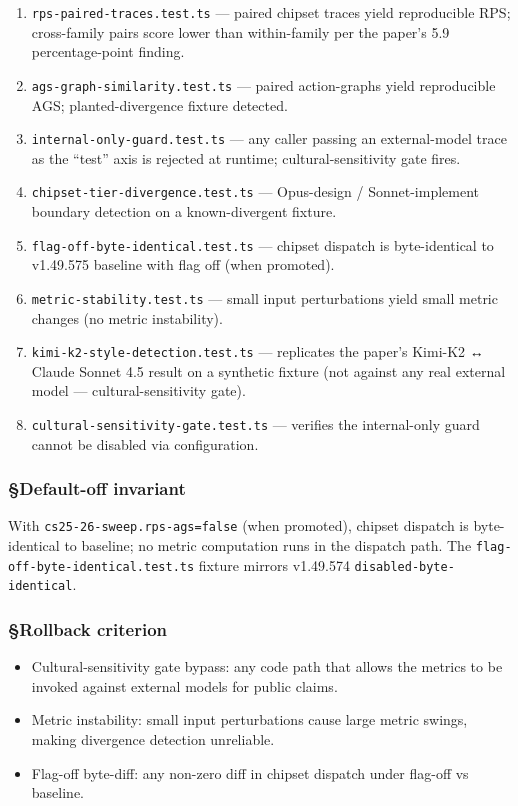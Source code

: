 \documentclass[11pt,letterpaper]{article}
\providecommand{\tightlist}{\setlength{\itemsep}{0pt}\setlength{\parskip}{0pt}}
\begin{document}
\begin{enumerate}
\def\labelenumi{\arabic{enumi}.}
\tightlist
\item
  \texttt{rps-paired-traces.test.ts} --- paired chipset traces yield
  reproducible RPS; cross-family pairs score lower than within-family
  per the paper's 5.9 percentage-point finding.
\item
  \texttt{ags-graph-similarity.test.ts} --- paired action-graphs yield
  reproducible AGS; planted-divergence fixture detected.
\item
  \texttt{internal-only-guard.test.ts} --- any caller passing an
  external-model trace as the ``test'' axis is rejected at runtime;
  cultural-sensitivity gate fires.
\item
  \texttt{chipset-tier-divergence.test.ts} --- Opus-design /
  Sonnet-implement boundary detection on a known-divergent fixture.
\item
  \texttt{flag-off-byte-identical.test.ts} --- chipset dispatch is
  byte-identical to v1.49.575 baseline with flag off (when promoted).
\item
  \texttt{metric-stability.test.ts} --- small input perturbations yield
  small metric changes (no metric instability).
\item
  \texttt{kimi-k2-style-detection.test.ts} --- replicates the paper's
  Kimi-K2 ↔ Claude Sonnet 4.5 result on a synthetic fixture (not against
  any real external model --- cultural-sensitivity gate).
\item
  \texttt{cultural-sensitivity-gate.test.ts} --- verifies the
  internal-only guard cannot be disabled via configuration.
\end{enumerate}

\subsubsection{§Default-off invariant}

With \texttt{cs25-26-sweep.rps-ags=false} (when promoted), chipset
dispatch is byte-identical to baseline; no metric computation runs in
the dispatch path. The \texttt{flag-off-byte-identical.test.ts} fixture
mirrors v1.49.574 \texttt{disabled-byte-identical}.

\subsubsection{§Rollback criterion}

\begin{itemize}
\tightlist
\item
  Cultural-sensitivity gate bypass: any code path that allows the
  metrics to be invoked against external models for public claims.
\item
  Metric instability: small input perturbations cause large metric
  swings, making divergence detection unreliable.
\item
  Flag-off byte-diff: any non-zero diff in chipset dispatch under
  flag-off vs baseline.
\end{itemize}
\end{document}

